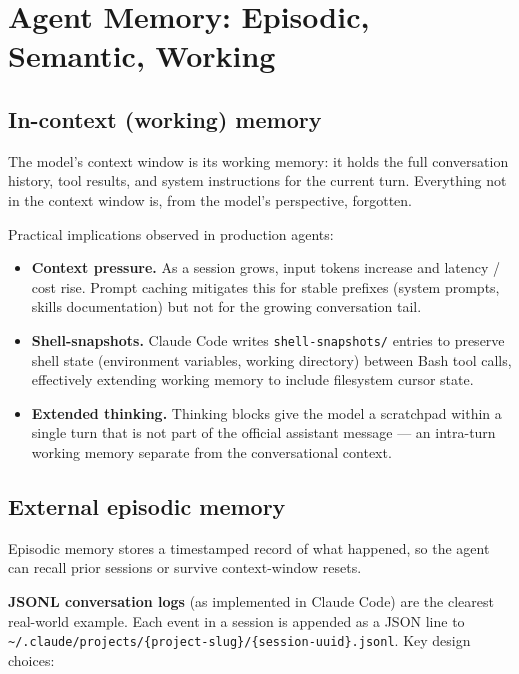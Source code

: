
\section{Agent Memory: Episodic, Semantic, Working}

\subsection{In-context (working) memory}

The model's context window is its working memory: it holds the full conversation history,
tool results, and system instructions for the current turn. Everything not in the context
window is, from the model's perspective, forgotten.

Practical implications observed in production agents:
\begin{itemize}
  \item \textbf{Context pressure.} As a session grows, input tokens increase and latency
    / cost rise. Prompt caching mitigates this for stable prefixes (system prompts, skills
    documentation) but not for the growing conversation tail.
  \item \textbf{Shell-snapshots.} Claude Code writes \texttt{shell-snapshots/} entries
    to preserve shell state (environment variables, working directory) between Bash tool
    calls, effectively extending working memory to include filesystem cursor state.
  \item \textbf{Extended thinking.} Thinking blocks give the model a scratchpad within
    a single turn that is not part of the official assistant message — an intra-turn
    working memory separate from the conversational context.
\end{itemize}

\subsection{External episodic memory}

Episodic memory stores a timestamped record of what happened, so the agent can recall
prior sessions or survive context-window resets.

\textbf{JSONL conversation logs} (as implemented in Claude Code) are the clearest
real-world example. Each event in a session is appended as a JSON line to
\texttt{\textasciitilde/.claude/projects/\{project-slug\}/\{session-uuid\}.jsonl}.
Key design choices:

